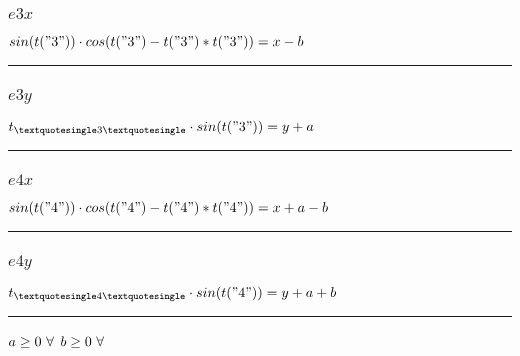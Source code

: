 \documentclass[11pt]{article}
\begin{document}
\subsubsection*{$e3x$}
$
sin(t("3")) \cdot cos(t("3") - t("3") * t("3")) = x - b
$
\vspace{5pt}
\hrule
\subsubsection*{$e3y$}
$
t_{\textquotesingle 3 \textquotesingle} \cdot sin(t("3")) = y + a
$
\vspace{5pt}
\hrule
\subsubsection*{$e4x$}
$
sin(t("4")) \cdot cos(t("4") - t("4") * t("4")) = x + a - b
$
\vspace{5pt}
\hrule
\subsubsection*{$e4y$}
$
t_{\textquotesingle 4 \textquotesingle} \cdot sin(t("4")) = y + a + b
$
\vspace{5pt}
\hrule
\bigskip
$a\geq 0 ~ \forall \\$
$b\geq 0 ~ \forall \\$
\end{document}
